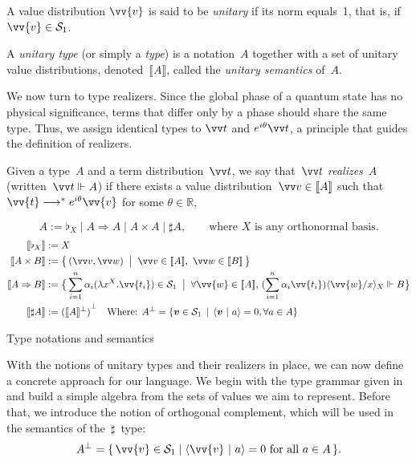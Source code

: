 \documentclass[runningheads,orivec,envcountsame,envcountsect]{llncs}
\newcommand\comp[2][]{#2^{\bot^{#1}}}
\newcommand\lra{\longrightarrow}
\newcommand\ansubst[2]{\ensuremath{\langle #1 \rangle_{#2}}}
\def\R{\mathbb{R}}            %
\def\Sph{\mathcal{S}_1}       %
\def\scal#1#2{\langle{#1}~|~{#2}\rangle}
\def\Lam#1#2#3{\lambda#1^{#2}{.}#3} %
\def\eval{\lra^*}
\def\Arr{\Rightarrow}
\def\sem#1{\llbracket#1\rrbracket}
\def\real{\Vdash}
\newcommand\basis[1]{\ensuremath{\flat_{#1}}}
\begin{document}
\begin{definition}
  A value distribution $\vv{v}$ is said to be \emph{unitary} if its norm equals~1,
  that is, if $\vv{v}\in\Sph$.
\end{definition}

\begin{definition}
  A \emph{unitary type} (or simply a \emph{type}) is a notation~$A$ together
  with a set of unitary value distributions, denoted~$\sem{A}$, called the
  \emph{unitary semantics} of~$A$.
\end{definition}


We now turn to type realizers.  
Since the global phase of a quantum state has no physical significance, terms
that differ only by a phase should share the same type.  
Thus, we assign identical types to $\vv t$ and $e^{i\theta}\vv t$, a principle
that guides the definition of realizers.

\begin{definition}\label{def:Realizer}
  Given a type~$A$ and a term distribution~$\vv t$, we say that~$\vv t$
  \emph{realizes}~$A$ (written~$\vv t \real A$) if there exists a value
  distribution~$\vv v\in\sem A$ such that
  $\vv{t}\eval e^{i\theta}\vv{v}$ for some $\theta\in\R$,
%
\end{definition}

\begin{table}[t]
  \[
    A := \basis{X} \mid A\Arr A \mid A\times A \mid \sharp A,
    \qquad\text{where $X$ is any orthonormal basis.}
  \]
  \begin{align*}
    \sem{\basis{X}}&:= X\\
    \sem{A\times B}&:= \bigl\{\,(\vv v, \vv w)\;\bigm|\; \vv v\in\sem{A},~\vv w\in\sem{B}\,\bigr\}\\
    \sem{A\Arr B}&:=
    \bigl\{\,\sum_{i=1}^{n}\alpha_i(\Lam{x}{X}{\vv{t_i}})\in\Sph
      \;\bigm|\;
      \forall\vv{w}\in\sem{A},\,
      (\sum_{i=1}^{n}\alpha_i \vv{t_i})\ansubst{\vv{w}/x}{X}\real B
    \bigr\}\\
    \sem{\sharp A}&:= {(\sem{A}^\bot)}^\bot\quad\text{Where: }A^\bot = \{\vec{v}\in\Sph\,\mid\,\scal{\vec{v}}{a} = 0, \forall a\in A\}
  \end{align*}
  \caption{Type notations and semantics}
  \label{tab:UnitaryTypes}
\end{table}

With the notions of unitary types and their realizers in place, we can now
define a concrete approach for our language. We begin with the type grammar
given in~ and build a simple algebra from the sets of
values we aim to represent.
Before that, we introduce the notion of orthogonal complement, which will be
used in the semantics of the~$\sharp$~type:
\[
  \comp{A} = \{\, \vv{v}\in \Sph \mid \scal{\vv{v}}{a} = 0 \text{ for all } a\in A\,\}.
\]
\end{document}
